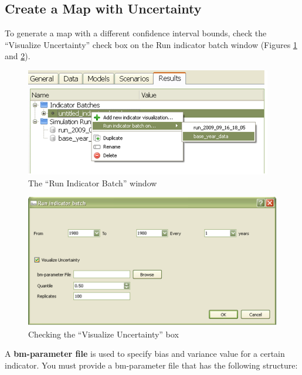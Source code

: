 \subsection{Create a Map with Uncertainty}

To generate a map with a different confidence interval bounds, check
the ``Visualize Uncertainty'' check box on the Run indicator batch
window (Figures \ref{fig:results-manager-uncertainty1} and
\ref{fig:results-manager-uncertainty2}).

\begin{figure}[htp]
\begin{center}
\includegraphics[width=.8\textwidth]{part-gui/images/result-manager-uncertainty1.png}
\end{center}
\caption{The ``Run Indicator Batch'' window}
\label{fig:results-manager-uncertainty1}
\end{figure}


\begin{figure}[htp]
\begin{center}
\includegraphics[width=.8\textwidth]{part-gui/images/result-manager-uncertainty2.png}
\end{center}
\caption{Checking the ``Visualize Uncertainty'' box}
\label{fig:results-manager-uncertainty2}
\end{figure}

A {\bf bm-parameter file} is used to specify bias and variance value for a
certain indicator. You must provide a bm-parameter file that has the
following structure:

